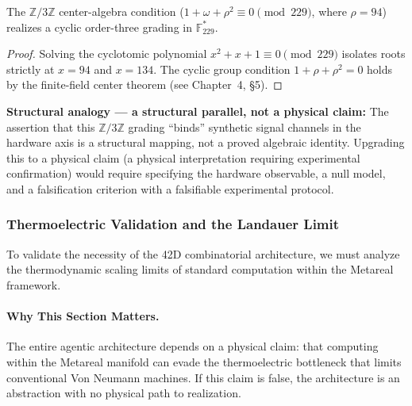 \begin{theorem}
The $\mathbb{Z}/3\mathbb{Z}$ center-algebra condition ($1 + \omega + \rho^2 \equiv 0 \pmod{229}$, where $\rho = 94$) realizes a cyclic order-three grading in $\mathbb{F}_{229}^*$.
\end{theorem}
\begin{proof}
Solving the cyclotomic polynomial $x^2 + x + 1 \equiv 0 \pmod{229}$ isolates roots strictly at $x = 94$ and $x = 134$. The cyclic group condition $1 + \rho + \rho^2 = 0$ holds by the finite-field center theorem (see Chapter~4, \S5). \qedhere
\end{proof}

\textbf{Structural analogy --- a structural parallel, not a physical claim:} The assertion that this $\mathbb{Z}/3\mathbb{Z}$ grading ``binds'' synthetic signal channels in the hardware axis is a structural mapping, not a proved algebraic identity. Upgrading this to a physical claim (a physical interpretation requiring experimental confirmation) would require specifying the hardware observable, a null model, and a falsification criterion with a falsifiable experimental protocol.

\subsubsection{Thermoelectric Validation and the Landauer Limit}

To validate the necessity of the 42D combinatorial architecture, we must analyze the thermodynamic scaling limits of standard computation within the Metareal framework. 

\paragraph{Why This Section Matters.}
The entire agentic architecture depends on a physical claim: that computing within the Metareal manifold can evade the thermoelectric bottleneck that limits conventional Von Neumann machines. If this claim is false, the architecture is an abstraction with no physical path to realization.

